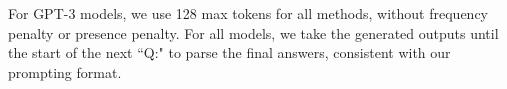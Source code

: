 For GPT-3 models, we use 128 max tokens for all methods, without frequency penalty or presence penalty. For all models, we take the generated outputs until the start of the next ``Q:" to parse the final answers, consistent with our prompting format.






